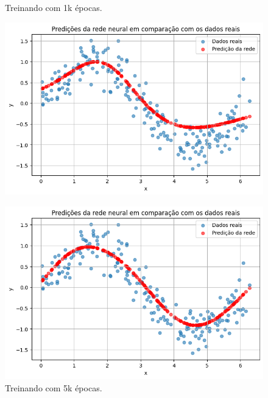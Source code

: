 \begin{figure}[htb]
	\centering
	\begin{minipage}{0.45\textwidth}
	\centering
	\caption{Treinando com 1k épocas.}\label{tarefa02:1000:predicoes}
	\includegraphics[width=\textwidth]{./0803_imgs/png-241110-154527304-12037654268696582542.png}
	\end{minipage}
	\hfill
	\begin{minipage}{0.45\textwidth}
	\centering
	\caption{Treinando com 5k épocas.}\label{tarefa02:5000:predicoes}
	\includegraphics[width=\textwidth]{./0803_imgs/png-241110-154628196-17784737572676737911.png}
	\end{minipage}
    \vspace{1Ex}
    \begin{minipage}{0.45\textwidth}

\end{minipage}
\end{figure}
